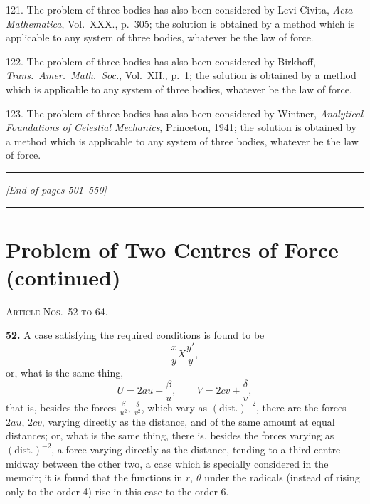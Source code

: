 \documentclass[11pt,a4paper]{book}
\begin{document}
121. The problem of three bodies has also been considered by Levi-Civita, \textit{Acta Mathematica}, Vol.~XXX., p.~305; the solution is obtained by a method which is applicable to any system of three bodies, whatever be the law of force.

122. The problem of three bodies has also been considered by Birkhoff, \textit{Trans.\ Amer.\ Math.\ Soc.}, Vol.~XII., p.~1; the solution is obtained by a method which is applicable to any system of three bodies, whatever be the law of force.

123. The problem of three bodies has also been considered by Wintner, \textit{Analytical Foundations of Celestial Mechanics}, Princeton, 1941; the solution is obtained by a method which is applicable to any system of three bodies, whatever be the law of force.

\vspace{1em}
\hrule
\vspace{1em}

\noindent\textit{[End of pages 501--550]}
\clearpage


\thispagestyle{fancy}

\noindent\rule{\textwidth}{0.5pt}

\section*{Problem of Two Centres of Force (continued)}

\noindent\textsc{Article Nos.~52 to 64.}

\medskip

\textbf{52.} A case satisfying the required conditions is found to be
\[
\frac{x}{y} X \frac{y'}{y},
\]
or, what is the same thing,
\[
U = 2au + \frac{\beta}{u}, \qquad V = 2cv + \frac{\delta}{v},
\]
that is, besides the forces $\frac{\beta}{u^2}$, $\frac{\delta}{v^2}$, which vary as $(\text{dist.})^{-2}$, there are the forces $2au$, $2cv$, varying directly as the distance, and of the same amount at equal distances; or, what is the same thing, there is, besides the forces varying as $(\text{dist.})^{-2}$, a force varying directly as the distance, tending to a third centre midway between the other two, a case which is specially considered in the memoir; it is found that the functions in $r$, $\theta$ under the radicals (instead of rising only to the order 4) rise in this case to the order 6.
\end{document}
